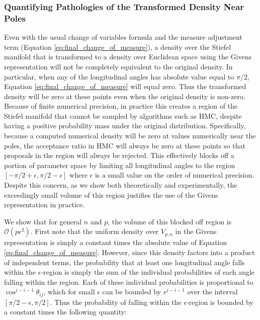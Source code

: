 \documentclass[ba]{imsart}
\numberwithin{equation}{section}
\theoremstyle{plain}
\begin{document}
\subsubsection{Quantifying Pathologies of the Transformed Density Near Poles}
\noindent  Even with the usual change of variables formula and the measure adjustment term (Equation \ref{eq:final_change_of_measure}), a density over the Stiefel manifold that is transformed to a density over Euclidean space using the Givens representation will not be completely equivalent to the original density. In particular, when any of the longitudinal angles has absolute value equal to $\pi/2$, Equation \ref{eq:final_change_of_measure} will equal zero. Thus the transformed density will be zero at these points even when the original density is non-zero. Because of finite numerical precision, in practice this creates a region of the Stiefel manifold that cannot be sampled by algorithms such as HMC, despite having a positive probability mass under the original distribution. Specifically, because a computed numerical density will be zero at values numerically near the poles, the acceptance ratio in HMC will always be zero at these points so that proposals in the region will always be rejected. This effectively blocks off a portion of parameter space by limiting all longitudinal angles to the region $[-\pi/2 + \epsilon, \pi/2 - \epsilon]$ where $\epsilon$ is a small value on the order of numerical precision. Despite this concern, as we show both theoretically and experimentally, the exceedingly small volume of this region justifies the use of the Givens representation in practice.

\noindent We show that for general $n$ and $p$, the volume of this blocked off region is $\mathcal{O}(p \epsilon^2)$. First note that the uniform density over $V_{p,n}$ in the Givens representation is simply a constant times the absolute value of Equation \ref{eq:final_change_of_measure}. However, since this density factors into a product of independent terms, the probability that at least one longitudinal angle falls within the $\epsilon$-region is simply the sum of the individual probabilities of each angle falling within the region. Each of these individual probabilities is proportional to $\cos^{j-i-1} \theta_{ij}$, which for small $\epsilon$ can be bounded by $\epsilon^{j-i-1}$ over the interval $[\pi/2 - \epsilon, \pi/2]$. Thus the probability of falling within the $\epsilon$-region is bounded by a constant times the following quantity:
\end{document}
